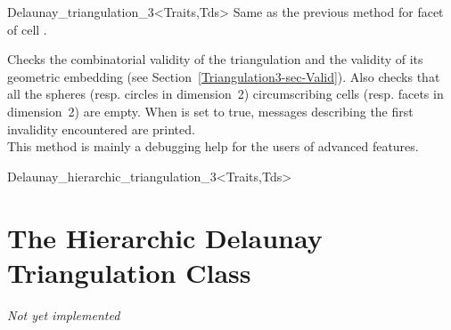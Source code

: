 \begin{ccClassTemplate}{Delaunay_triangulation_3<Traits,Tds>}
{Same as the previous method for facet  of cell .}

\begin{ccAdvanced}
{Checks the combinatorial validity of the triangulation and the
validity of its geometric embedding (see
Section~\ref{Triangulation3-sec-Valid}). Also checks that all the spheres
(resp. circles in dimension~2) circumscribing cells (resp. facets in
dimension~2) are empty. When  is set to true, 
messages describing the first invalidity encountered are printed.\\
This method is  mainly a debugging help for the users of advanced features.
}
\end{ccAdvanced}

\end{ccClassTemplate}

\begin{ccClassTemplate}{Delaunay_hierarchic_triangulation_3<Traits,Tds>}
\section{The Hierarchic Delaunay Triangulation Class\\ \protect
{} }

\textit{Not yet implemented}

\end{ccClassTemplate}

